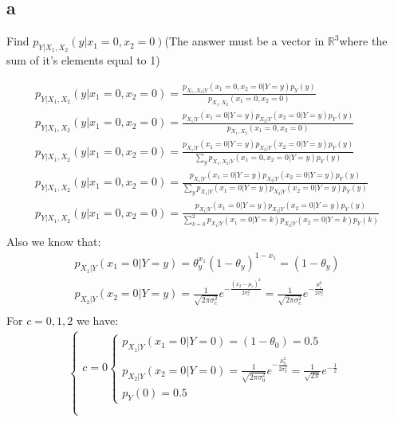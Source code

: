 \documentclass[12pt]{article}
\begin{document}
\subsection{a}
Find $p_{Y|X_1,X_2}(y|x_1 = 0 ,x_2 = 0)$(The answer must be a vector in $\mathbb{R}^3$where the sum of it’s elements equal to 1)
\begin{qsolve}
    \begin{gather*}
        p_{Y|X_1,X_2}(y|x_1 = 0 ,x_2 = 0) = \frac{p_{X_1,X_2|Y}(x_1 = 0 ,x_2 = 0|Y=y) p_Y(y)}{p_{X_1,X_2}(x_1 = 0 ,x_2 = 0)}\\
        p_{Y|X_1,X_2}(y|x_1 = 0 ,x_2 = 0) = \frac{p_{X_1|Y}(x_1 = 0|Y=y) p_{X_2|Y}(x_2 = 0|Y=y) p_Y(y)}{p_{X_1,X_2}(x_1 = 0 ,x_2 = 0)}\\
        p_{Y|X_1,X_2}(y|x_1 = 0 ,x_2 = 0) = \frac{p_{X_1|Y}(x_1 = 0|Y=y) p_{X_2|Y}(x_2 = 0|Y=y) p_Y(y)}{\sum_{y} p_{X_1,X_2|Y}(x_1 = 0 ,x_2 = 0|Y=y) p_Y(y)}\\
        p_{Y|X_1,X_2}(y|x_1 = 0 ,x_2 = 0) = \frac{p_{X_1|Y}(x_1 = 0|Y=y) p_{X_2|Y}(x_2 = 0|Y=y) p_Y(y)}{\sum_{y} p_{X_1|Y}(x_1 = 0|Y=y) p_{X_2|Y}(x_2 = 0|Y=y) p_Y(y)}\\
        p_{Y|X_1,X_2}(y|x_1 = 0 ,x_2 = 0) = \frac{p_{X_1|Y}(x_1 = 0|Y=y) p_{X_2|Y}(x_2 = 0|Y=y) p_Y(y)}{\sum_{k=0}^{2} p_{X_1|Y}(x_1 = 0|Y=k) p_{X_2|Y}(x_2 = 0|Y=k) p_Y(k)}\\
    \end{gather*}
    Also we know that:
    \begin{gather*}
        p_{X_1|Y}(x_1 = 0|Y=y) = \theta_y^{x_1} (1 - \theta_y)^{1 - x_1} = (1 - \theta_y)\\
        p_{X_2|Y}(x_2 = 0|Y=y) = \frac{1}{\sqrt{2 \pi \sigma_c^2}} e^{-\frac{(x_2 - \mu_c)^2}{2 \sigma_c^2}} = \frac{1}{\sqrt{2 \pi \sigma_c^2}} e^{-\frac{\mu_c^2}{2 \sigma_c^2}}\\
    \end{gather*}
    \splitqsolve
    For $c = 0 , 1 , 2$ we have:
    \begin{gather*}
        \begin{cases}
            c = 0 \begin{cases}
                p_{X_1|Y}(x_1 = 0|Y=0) = (1 - \theta_0) = 0.5                                                                                          \\
                p_{X_2|Y}(x_2 = 0|Y=0) = \frac{1}{\sqrt{2 \pi \sigma_0^2}} e^{-\frac{\mu_0^2}{2 \sigma_0^2}} = \frac{1}{\sqrt{2 \pi}} e^{-\frac{1}{2}} \\
                p_Y(0) = 0.5
            \end{cases} \\ \\

\end{cases}
\end{gather*}
\end{qsolve}
\end{document}
